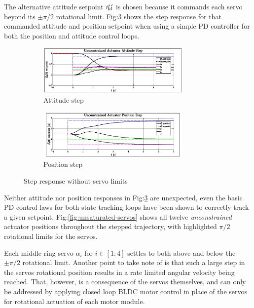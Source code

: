 The alternative attitude setpoint $\vec{\eta}_d\text{}\hspace{-2pt}'$ is chosen because it commands each servo beyond its $\pm \pi/2$ rotational limit. Fig:\ref{fig:unsaturated-step} shows the step response for that commanded attitude and position setpoint when using a simple PD controller for both the position and attitude control loops.
\begin{figure}[hbtp]
\vspace{-2pt}
\centering
\begin{subfigure}{\textwidth}
\centering
\includegraphics[width=0.82\textwidth]{graphs/unsaturated-attitude-step}
\caption{Attitude step}
\label{fig:unsaturated-attitude-step}
\end{subfigure}
\vspace{-4pt}
\begin{subfigure}{\textwidth}
\centering
\includegraphics[width=0.82\textwidth]{graphs/unsaturated-position-step}
\caption{Position step}
\label{fig:unsaturated-position-step}
\end{subfigure}
\caption{Step response without servo limits}
\label{fig:unsaturated-step}
\vspace{-8pt}
\end{figure}
\par
Neither attitude nor position responses in Fig:\ref{fig:unsaturated-step} are unexpected, even the basic PD control laws for both state tracking loops have been shown to correctly track a given setpoint. Fig:\ref{fig:unsaturated-servos} shows all twelve \emph{unconstrained} actuator positions throughout the stepped trajectory, with highlighted $\pi/2$ rotational limits for the servos. 
\par
Each middle ring servo $\alpha_i$ for $i\in[1:4]$ settles to both above and below the $\pm\pi/2$ rotational limit. Another point to take note of is that such a large step in the servos rotational position results in a rate limited angular velocity being reached. That, however, is a consequence of the servos themselves, and can only be addressed by applying closed loop BLDC motor control in place of the servos for rotational actuation of each motor module.
